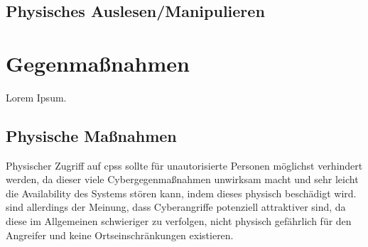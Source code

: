 \documentclass[final,bibliography=totocnumbered]{include/sikseminar}
\newcommand{\cps}{\glspl{cps}\xspace}
\begin{document}

\subsection{Physisches Auslesen/Manipulieren}


%



\section{Gegenmaßnahmen}\label{sec:gegenmassnahmen}





%

Lorem Ipsum.

\subsection{Physische Maßnahmen}\label{subsec:physisch}
Physischer Zugriff auf \cps sollte für unautorisierte Personen möglichst verhindert werden, da dieser viele Cybergegenmaßnahmen unwirksam macht und sehr leicht die Availability des Systems stören kann, indem dieses physisch beschädigt wird.
\citeauthor{CAS08} sind allerdings der Meinung, dass Cyberangriffe potenziell attraktiver sind, da diese im Allgemeinen schwieriger zu verfolgen, nicht physisch gefährlich für den Angreifer und keine Ortseinschränkungen existieren.
\end{document}
